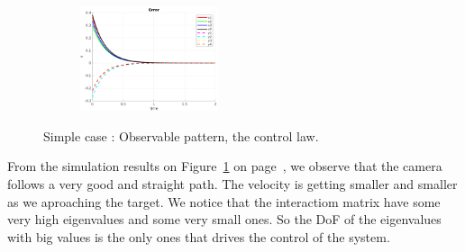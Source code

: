 \documentclass[a4paper,12pt]{article}
\begin{document}
\begin{figure}[t!]
\begin{subfigure}[b]{0.2\textwidth}
                 \end{subfigure}%
         \begin{subfigure}[b]{0.32\textwidth}
                \centering
                \includegraphics[height=1.2in]{../results/Demo1-error.png}
                 \end{subfigure}%
         \caption{Simple case : Observable pattern, the control law.}
        \label{fig:demo1}
\end{figure}
From the simulation results on Figure~\ref{fig:demo1} on page~\pageref{fig:demo1}, we observe that the camera follows a very good and straight path. The velocity is getting smaller and smaller as we aproaching the target. 
We notice that the interactiom matrix have some very high eigenvalues and some very small ones. So the DoF of the eigenvalues with big values is the only ones that drives the control of the system.
\end{document}
